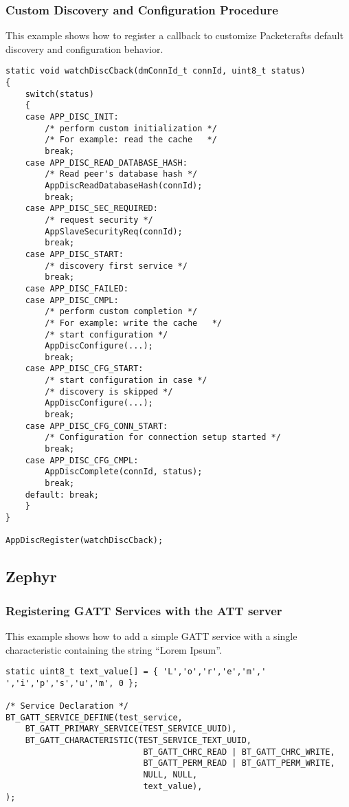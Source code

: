 \subsubsection{Custom Discovery and Configuration Procedure}
\label{sec:app_a_packetcraft_discovery}
This example shows how to register a callback to customize Packetcrafts default discovery and configuration behavior.
\begin{lstlisting}
static void watchDiscCback(dmConnId_t connId, uint8_t status)
{
    switch(status)
    {
    case APP_DISC_INIT:
        /* perform custom initialization */
        /* For example: read the cache   */
        break;
    case APP_DISC_READ_DATABASE_HASH:
        /* Read peer's database hash */
        AppDiscReadDatabaseHash(connId);
        break;
    case APP_DISC_SEC_REQUIRED:
        /* request security */
        AppSlaveSecurityReq(connId);
        break;
    case APP_DISC_START:
        /* discovery first service */
        break;
    case APP_DISC_FAILED:
    case APP_DISC_CMPL:
        /* perform custom completion */
        /* For example: write the cache   */
        /* start configuration */
        AppDiscConfigure(...);
        break;
    case APP_DISC_CFG_START:
        /* start configuration in case */
        /* discovery is skipped */
        AppDiscConfigure(...);
        break;
    case APP_DISC_CFG_CONN_START:
        /* Configuration for connection setup started */
        break;
    case APP_DISC_CFG_CMPL:
        AppDiscComplete(connId, status);
        break;
    default: break;
    }
}

AppDiscRegister(watchDiscCback);
\end{lstlisting}

\subsection{Zephyr}
\subsubsection{Registering GATT Services with the ATT server}
This example shows how to add a simple GATT service with a single characteristic containing the string ``Lorem Ipsum''. 
\begin{lstlisting}
static uint8_t text_value[] = { 'L','o','r','e','m',' ','i','p','s','u','m', 0 };

/* Service Declaration */
BT_GATT_SERVICE_DEFINE(test_service,
    BT_GATT_PRIMARY_SERVICE(TEST_SERVICE_UUID),
    BT_GATT_CHARACTERISTIC(TEST_SERVICE_TEXT_UUID, 
                            BT_GATT_CHRC_READ | BT_GATT_CHRC_WRITE,
                            BT_GATT_PERM_READ | BT_GATT_PERM_WRITE,
                            NULL, NULL, 
                            text_value),
);
\end{lstlisting}

